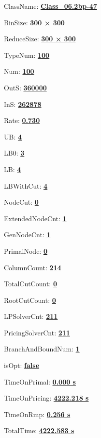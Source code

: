 \documentclass[11pt]{article}
\begin{document}
\pagestyle{empty}


ClassName: \underline{\textbf{Class_06.2bp-47}}
\par
BinSize: \underline{\textbf{300 × 300}}
\par
ReduceSize: \underline{\textbf{300 × 300}}
\par
TypeNum: \underline{\textbf{100}}
\par
Num: \underline{\textbf{100}}
\par
OutS: \underline{\textbf{360000}}
\par
InS: \underline{\textbf{262878}}
\par
Rate: \underline{\textbf{0.730}}
\par
UB: \underline{\textbf{4}}
\par
LB0: \underline{\textbf{3}}
\par
LB: \underline{\textbf{4}}
\par
LBWithCut: \underline{\textbf{4}}
\par
NodeCut: \underline{\textbf{0}}
\par
ExtendedNodeCnt: \underline{\textbf{1}}
\par
GenNodeCnt: \underline{\textbf{1}}
\par
PrimalNode: \underline{\textbf{0}}
\par
ColumnCount: \underline{\textbf{214}}
\par
TotalCutCount: \underline{\textbf{0}}
\par
RootCutCount: \underline{\textbf{0}}
\par
LPSolverCnt: \underline{\textbf{211}}
\par
PricingSolverCnt: \underline{\textbf{211}}
\par
BranchAndBoundNum: \underline{\textbf{1}}
\par
isOpt: \underline{\textbf{false}}
\par
TimeOnPrimal: \underline{\textbf{0.000 s}}
\par
TimeOnPricing: \underline{\textbf{4222.218 s}}
\par
TimeOnRmp: \underline{\textbf{0.256 s}}
\par
TotalTime: \underline{\textbf{4222.583 s}}
\par
\newpage
\end{document}
